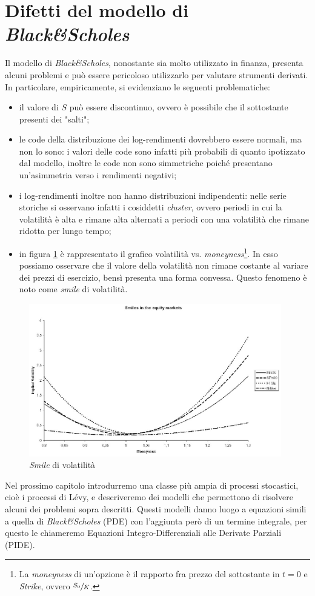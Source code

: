\documentclass[a4paper,10pt]{report}
\theoremstyle{plain}
\theoremstyle{definition}
\theoremstyle{remark}
\begin{document}
\section{Difetti del modello di \emph{Black\&Scholes}}
Il modello di \emph{Black\&Scholes}, nonostante sia molto utilizzato in finanza, presenta alcuni problemi e pu\`o essere pericoloso utilizzarlo per valutare strumenti derivati. In particolare, empiricamente, si evidenziano le seguenti problematiche:
\begin{itemize}
\item il valore di $S$ pu\`o essere discontinuo, ovvero \`e possibile che il sottostante presenti dei "salti";
\item le code della distribuzione dei log-rendimenti dovrebbero essere normali, ma non lo sono: i valori delle code sono infatti pi\`u probabili di quanto ipotizzato dal modello, inoltre le code non sono simmetriche poich\'e presentano un'asimmetria verso i rendimenti negativi;
\item i log-rendimenti inoltre non hanno distribuzioni indipendenti: nelle serie storiche si osservano infatti i cosiddetti \emph{cluster}, ovvero periodi in cui la volatilit\`a \`e alta e rimane alta alternati a periodi con una volatilit\`a che rimane ridotta per lungo tempo;
\item in figura \ref{smile} \`e rappresentato il grafico volatilit\`a vs. \emph{moneyness}\footnote{La \emph{moneyness} di un'opzione \`e il rapporto fra prezzo del sottostante in $t=0$ e \emph{Strike}, ovvero $\sfrac{S_0}{K}$.}. In esso possiamo osservare che il valore della volatilit\`a non rimane costante al variare dei prezzi di esercizio, bens\`i presenta una forma convessa. Questo fenomeno \`e noto come \emph{smile} di volatilit\`a.
\end{itemize}
\begin{figure}[htbp!]
\begin{center}
\includegraphics[width=11cm]{img/smile.jpg}
\caption{\emph{Smile} di volatilit\`a}
\label{smile}
\end{center}
\end{figure}
Nel prossimo capitolo introdurremo una classe pi\`u ampia di processi stocastici, cio\`e i processi di L\'evy, e descriveremo dei modelli che permettono di risolvere alcuni dei problemi sopra descritti. Questi modelli danno luogo a equazioni simili a quella di \emph{Black\&Scholes} (PDE) con l'aggiunta per\`o di un termine integrale, per questo le chiameremo Equazioni Integro-Differenziali alle Derivate Parziali (PIDE).
\end{document}

